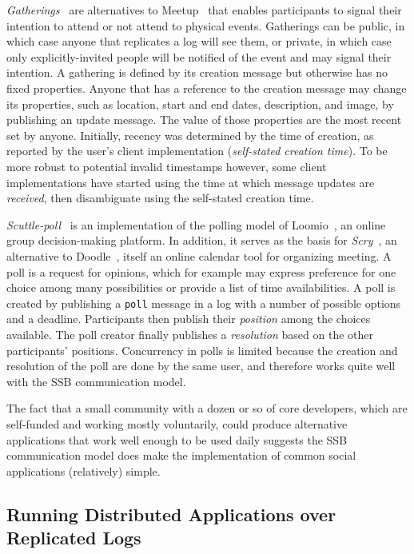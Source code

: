 \documentclass[10pt,sigconf,rewiew]{acmart}
\begin{document}
\textit{Gatherings}~\cite{patch-gatherings} are alternatives to
Meetup~\cite{meetup.com} that enables participants to signal their intention to
attend or not attend to physical events. Gatherings can be public, in which
case anyone that replicates a log will see them, or private, in which case only
explicitly-invited people will be notified of the event and may signal their
intention. A gathering is defined by its creation message but otherwise has no
fixed properties. Anyone that has a reference to the creation message may
change its properties, such as location, start and end dates, description, and
image, by publishing an update message. The value of those properties are the
most recent set by anyone. Initially, recency was determined by the time of
creation, as reported by the user's client implementation (\textit{self-stated
creation time}). To be more robust to potential invalid
timestamps however, some client implementations have started using the time at
which message updates are \textit{received}, then disambiguate using the
self-stated creation time.

\textit{Scuttle-poll}~\cite{scuttle-poll} is an implementation of the polling
model of Loomio~\cite{loomio}, an online group decision-making platform. In
addition, it serves as the basis for \textit{Scry}~\cite{patchbay-scry}, an
alternative to Doodle~\cite{doodle.com}, itself an online calendar tool for
organizing meeting. A poll is a request for opinions, which for example may
express preference for one choice among many possibilities or provide a list of
time availabilities. A poll is created by publishing a \texttt{poll} message in
a log with a number of possible options and a deadline. Participants then
publish their \textit{position} among the choices available. The poll creator
finally publishes a \textit{resolution} based on the other participants'
positions. Concurrency in polls is limited because the creation and resolution
of the poll are done by the same user, and therefore works quite well with the
SSB communication model.

The fact that a small community with a dozen or so of core developers, which are self-funded
and working mostly voluntarily, could produce alternative applications that
work well enough to be used daily suggests the SSB communication model does
make the implementation of common social applications (relatively) simple.

\subsection{Running Distributed Applications over Replicated Logs}
\label{ssect:dapps}
\end{document}
